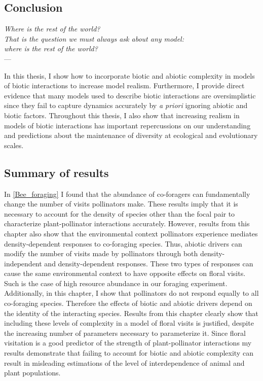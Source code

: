 \begin{refsection}
\chapter{Conclusion} %
\label{Conclusion}
\begin{flushright}{\slshape
    Where is the rest of the world? \\
    That is the question we must always ask about any model: \\
    where is the rest of the world?
    } \\ \medskip
    --- \textcite{levins2006strategies}
\end{flushright}

\bigskip

In this thesis, I show how to incorporate biotic and abiotic complexity in models of biotic interactions to increase model realism. Furthermore, I provide direct evidence that many models used to describe biotic interactions are oversimplistic since they fail to capture dynamics accurately by \textit{a priori} ignoring abiotic and biotic factors. Throughout this thesis, I also show that increasing realism in models of biotic interactions has important repercussions on our understanding and predictions about the maintenance of diversity at ecological and evolutionary scales.

\section*{Summary of results}
In \autoref{Bee_foraging} I found that the abundance of co-foragers can fundamentally change the number of visits pollinators make. These results imply that it is necessary to account for the density of species other than the focal pair to characterize plant-pollinator interactions accurately. However, results from this chapter also show that the environmental context pollinators experience mediates density-dependent responses to co-foraging species. Thus, abiotic drivers can modify the number of visits made by pollinators through both density-independent and density-dependent responses. These two types of responses can cause the same environmental context to have opposite effects on floral visits. Such is the case of high resource abundance in our foraging experiment. Additionally, in this chapter, I show that pollinators do not respond equally to all co-foraging species. Therefore the effects of biotic and abiotic drivers depend on the identity of the interacting species. Results from this chapter clearly show that including these levels of complexity in a model of floral visits is justified, despite the increasing number of parameters necessary to parameterize it. Since floral visitation is a good predictor of the strength of plant-pollinator interactions \citep{vazquez2005interaction, vazquez_strength_2012} my results demonstrate that failing to account for biotic and abiotic complexity can result in misleading estimations of the level of interdependence of animal and plant populations.



\end{refsection}
